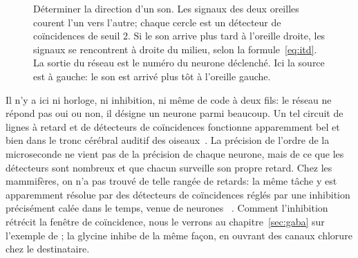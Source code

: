 \begin{figure}[t]
\centering
{}
\caption{Déterminer la direction d'un son. Les signaux des deux oreilles courent l'un vers l'autre; chaque cercle est un détecteur de coïncidences de seuil $2$. Si le son arrive plus tard à l'oreille droite, les signaux se rencontrent à droite du milieu, selon la formule~\eqref{eq:itd}. La sortie du réseau est le numéro du neurone déclenché. Ici la source est à gauche: le son est arrivé plus tôt à l'oreille gauche.}
\label{fig:itd}
\end{figure}

Il n'y a ici ni horloge, ni inhibition, ni même de code à deux fils: le réseau ne répond pas \og oui\fg{} ou \og non\fg, il désigne un neurone parmi beaucoup. Un tel circuit de lignes à retard et de détecteurs de coïncidences fonctionne apparemment bel et bien dans le tronc cérébral auditif des oiseaux~\cite{Carr1990}. La précision de l'ordre de la microseconde ne vient pas de la précision de chaque neurone, mais de ce que les détecteurs sont nombreux et que chacun surveille son propre retard. Chez les mammifères, on n'a pas trouvé de telle rangée de retards: la même tâche y est apparemment résolue par des détecteurs de coïncidences réglés par une inhibition précisément calée dans le temps, venue de neurones ~\cite{Brand2002,Grothe2010}. Comment l'inhibition rétrécit la fenêtre de coïncidence, nous le verrons au chapitre~\ref{sec:gaba} sur l'exemple de ; la glycine inhibe de la même façon, en ouvrant des canaux chlorure chez le destinataire.

